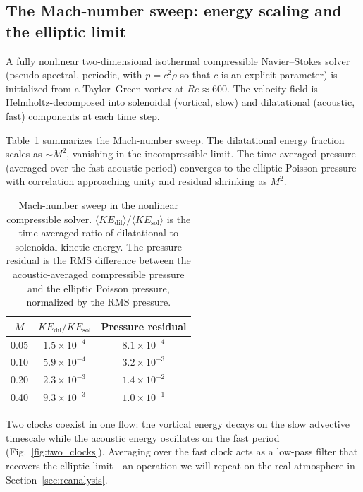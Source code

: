 \documentclass[11pt]{article}
\begin{document}
\subsection{The Mach-number sweep: energy scaling and the elliptic limit}
\label{sec:nonlinear}

A fully nonlinear two-dimensional isothermal compressible Navier--Stokes solver (pseudo-spectral, periodic, with $p = c^2\rho$ so that $c$ is an explicit parameter) is initialized from a Taylor--Green vortex at $Re \approx 600$. The velocity field is Helmholtz-decomposed into solenoidal (vortical, slow) and dilatational (acoustic, fast) components at each time step.

Table~\ref{tab:mach} summarizes the Mach-number sweep. The dilatational energy fraction scales as $\sim M^2$, vanishing in the incompressible limit. The time-averaged pressure (averaged over the fast acoustic period) converges to the elliptic Poisson pressure with correlation approaching unity and residual shrinking as $M^2$.

\begin{table}[t]
\centering
\caption{Mach-number sweep in the nonlinear compressible solver.
$\langle KE_{\mathrm{dil}}\rangle / \langle KE_{\mathrm{sol}}\rangle$ is the
time-averaged ratio of dilatational to solenoidal kinetic energy. The pressure
residual is the RMS difference between the acoustic-averaged compressible pressure
and the elliptic Poisson pressure, normalized by the RMS pressure.}
\label{tab:mach}
\begin{tabular}{ccc}
\toprule
$M$ & $KE_{\mathrm{dil}}/KE_{\mathrm{sol}}$ &
Pressure residual \\
\midrule
0.05 & $1.5\times 10^{-4}$ & $8.1\times 10^{-4}$ \\
0.10 & $5.9\times 10^{-4}$ & $3.2\times 10^{-3}$ \\
0.20 & $2.3\times 10^{-3}$ & $1.4\times 10^{-2}$ \\
0.40 & $9.3\times 10^{-3}$ & $1.0\times 10^{-1}$ \\
\bottomrule
\end{tabular}
\end{table}

Two clocks coexist in one flow: the vortical energy decays on the slow advective timescale while the acoustic energy oscillates on the fast period (Fig.~\ref{fig:two_clocks}). Averaging over the fast clock acts as a low-pass filter that recovers the elliptic limit---an operation we will repeat on the real atmosphere in Section~\ref{sec:reanalysis}.
\end{document}

